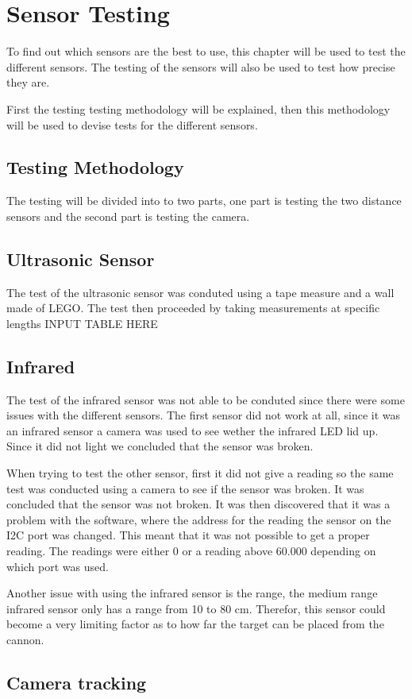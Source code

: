 \section{Sensor Testing}
To find out which sensors are the best to use, this chapter will be used to test
the different sensors. The testing of the sensors will also be used to test how
precise they are.\nl

First the testing testing methodology will be explained, then this methodology
will be used to devise tests for the different sensors. 

\subsection{Testing Methodology}
The testing will be divided into to two parts, one part is testing the two
distance sensors and the second part is testing the camera. 

\subsection{Ultrasonic Sensor}
The test of the ultrasonic sensor was conduted using a tape measure and a wall
made of LEGO. The test then proceeded by taking measurements at specific
lengths 
{INPUT TABLE HERE}

\subsection{Infrared}
The test of the infrared sensor was not able to be conduted since there were
some issues with the different sensors. The first sensor did not work at all,
since it was an infrared sensor a camera was used to see wether the infrared LED
lid up. Since it did not light we concluded that the sensor was broken. \nl

When trying to test the other sensor, first it did not give a reading so the
same test was conducted using a camera to see if the sensor was broken. It was
concluded that the sensor was not broken. It was then discovered that it was a
problem with the software, where the address for the reading the sensor on the
I2C port was changed. This meant that it was not possible to get a proper
reading. The readings were either 0 or a reading above 60.000 depending on which
port was used. \nl

Another issue with using the infrared sensor is the range, the medium range
infrared sensor only has a range from 10 to 80 cm. Therefor, this sensor could
become a very limiting factor as to how far the target can be placed from the
cannon. 

\subsection{Camera tracking}%